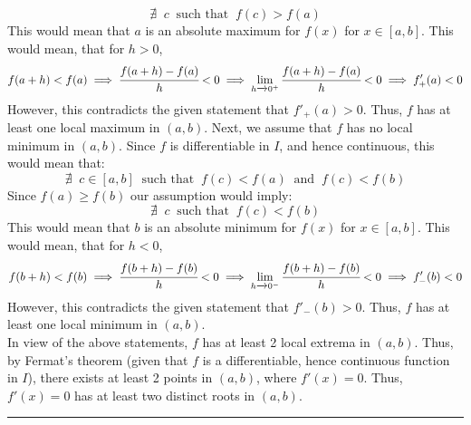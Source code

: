 \documentclass{article}
\begin{document}
$$\nexists \;\; c \;\; \text{such that} \;\; f(c) > f(a)$$
This would mean that $a$ is an absolute maximum for $f(x)$ for $x \in [a, b]$. This would mean, that for $h > 0$,
$$f(a+h) < f(a) \implies \cfrac{f(a + h) - f(a)}{h} < 0 \implies  \displaystyle\lim_{h \xrightarrow{} 0^{+}} \cfrac{f(a + h) - f(a)}{h} < 0 \implies f'_{+}(a) < 0$$
However, this contradicts the given statement that  $f'_{+}(a) > 0$. Thus, $f$ has at least one local maximum in $(a, b)$.
Next, we assume that $f$ has no local minimum in $(a, b)$. Since $f$ is differentiable in $I$, and hence continuous, this would mean that:
$$\nexists \;\; c \in [a, b] \;\; \text{such that} \;\; f(c) < f(a) \;\; \text{and} \;\; f(c)<f(b)$$
Since $f(a) \geq f(b)$ our assumption would imply:
$$\nexists \;\; c \;\; \text{such that} \;\; f(c) < f(b)$$
This would mean that $b$ is an absolute minimum for $f(x)$ for $x \in [a, b]$. This would mean, that for $h < 0$,
$$f(b+h) < f(b) \implies \cfrac{f(b + h) - f(b)}{h} < 0 \implies  \displaystyle\lim_{h \xrightarrow{} 0^{-}} \cfrac{f(b + h) - f(b)}{h} < 0 \implies f'_{-}(b) < 0$$
However, this contradicts the given statement that  $f'_{-}(b) > 0$. Thus, $f$ has at least one local minimum in $(a, b)$.
\\ In view of the above statements, $f$ has at least 2 local extrema in $(a, b)$. Thus, by Fermat's theorem (given that $f$ is a differentiable, hence continuous function in $I$), there exists at least 2 points in $(a, b)$, where $f'(x) = 0$. Thus, $f'(x) = 0$ has at least two distinct roots in $(a, b)$.
\newline
\newline
\newline
\vspace{5pt}
\hrule
\end{document}
